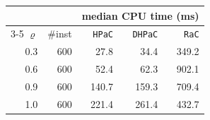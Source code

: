 \begin{tabular}{@{}rrrrr@{}}
\toprule
 &  & \multicolumn{3}{c}{median CPU time (ms)} \\
\cmidrule(l){3-5}
$\varrho$ & \#inst & \texttt{HPaC} & \texttt{DHPaC} & \texttt{RaC} \\
\midrule
0.3 & 600 & 27.8 & 34.4 & 349.2 \\
0.6 & 600 & 52.4 & 62.3 & 902.1 \\
0.9 & 600 & 140.7 & 159.3 & 709.4 \\
1.0 & 600 & 221.4 & 261.4 & 432.7 \\
\bottomrule
\end{tabular}
